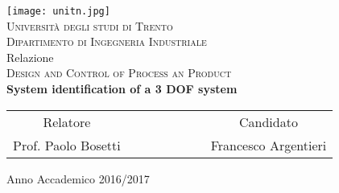 \begin{titlepage}
 \begin{center}
 \texttt{[image: unitn.jpg]}\\
 \vspace{1em}
 {\Large \textsc{Università degli studi di Trento}}\\
 \vspace{1em}
 {\Large \textsc{Dipartimento di Ingegneria Industriale}}\\
 \vspace{4em}
 {\normalsize Relazione}\\
 \vspace{1em}
 {\Large \textsc{Design and Control of Process an Product}}\\
 \vspace{4em}
 {\LARGE\textbf{
 	System identification of a 3 DOF system
 }}\\
 \end{center}

\vskip 2.0cm
 \begin{center}
 \begin{tabular}{c c c c c c c c}
 Relatore & & & & & & & Candidato \\[0.2cm]
 \large{Prof. Paolo Bosetti} & & & & & & & \large{Francesco Argentieri}\\[0.4cm]
 \end{tabular}
 \end{center}

\vskip 1.5cm
\begin{center}
{\normalsize Anno Accademico 2016/2017}
\end{center}
\end{titlepage}

\clearpage{\pagestyle{empty}\cleardoublepage}

